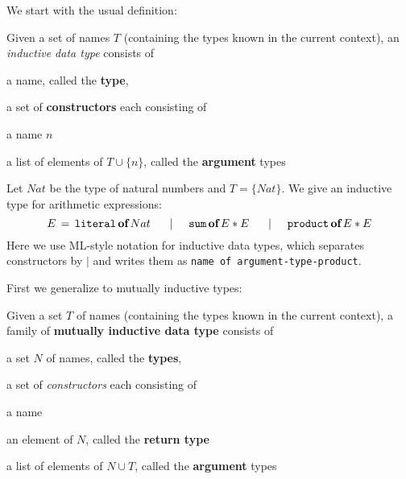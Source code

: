 We start with the usual definition:

\begin{definition}
Given a set of names $T$ (containing the types known in the current context), an \emph{inductive data type} consists of
\begin{compactitem}
 \item a name, called the \textbf{type},
 \item a set of \textbf{constructors} each consisting of
 \begin{compactitem}
  \item a name $n$
  \item a list of elements of $T\cup\{n\}$, called the \textbf{argument} types
 \end{compactitem} 
\end{compactitem}
\end{definition}

\newcommand{\cons}[2]{\mathtt{#1}\,\kw{of}\,\fold{*}{#2}}
\newcommand{\indtype}[2]{#1\,=\,\fold{\;\tb|\tb}{#2}}
\newcommand{\consnot}[3]{\mathtt{#1}\,\kw{of}\,\fold{*}{#2}\,\#\,#3}
\newcommand{\consn}[2]{\mathtt{#1}\,\#\,#2}

\begin{example}
Let $Nat$ be the type of natural numbers and $T=\{Nat\}$.
We give an inductive type for arithmetic expressions:
\[
\indtype{E}{\cons{literal}{Nat}, \cons{sum}{E,E}, \cons{product}{E,E}} \\
\]
Here we use ML-style notation for inductive data types, which separates constructors by $|$ and writes them as \texttt{name of argument-type-product}.
\end{example}

First we generalize to mutually inductive types:

\begin{definition}
Given a set $T$ of names (containing the types known in the current context), a family of \textbf{mutually inductive data type} consists of
\begin{compactitem}
 \item a set $N$ of names, called the \textbf{types},
 \item a set of \emph{constructors} each consisting of
 \begin{compactitem}
  \item a name
  \item an element of $N$, called the \textbf{return type}
  \item a list of elements of $N\cup T$, called the \textbf{argument} types
 \end{compactitem} 
\end{compactitem}
\end{definition}

